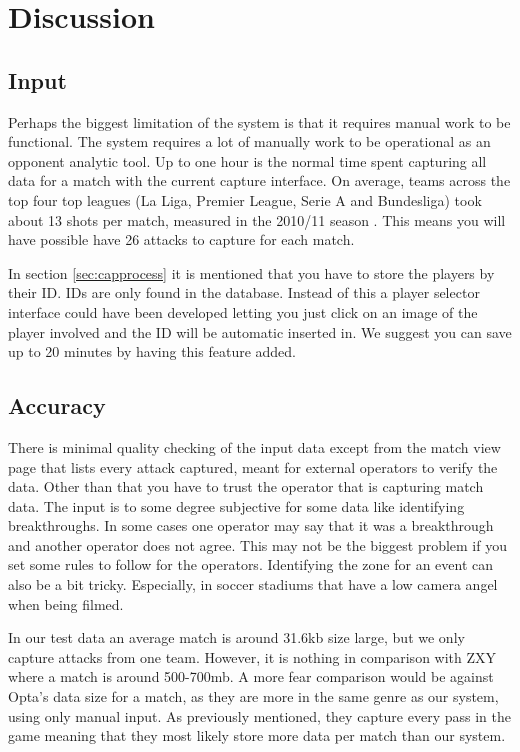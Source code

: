 \section{Discussion}
\subsection{Input}

Perhaps the biggest limitation of the system is that it requires manual work to be functional. The system requires a lot of manually work to be operational as an opponent analytic tool. Up to one hour is the normal time spent capturing all data for a match with the current capture interface. On average, teams across the top four top leagues (La Liga, Premier League, Serie A and Bundesliga) took about 13 shots per match, measured in the 2010/11 season \cite{soccerbynumbers}. This means you will have possible have 26 attacks to capture for each match. 

In section \ref{sec:capprocess} it is mentioned that you have to store the players by their ID. IDs are only found in the database. Instead of this a player selector interface could have been developed letting you just click on an image of the player involved and the ID will be automatic inserted in. We suggest you can save up to 20 minutes by having this feature added.

\subsection{Accuracy}

There is minimal quality checking of the input data except from the match view page that lists every attack captured, meant for external operators to verify the data. Other than that you have to trust the operator that is capturing match data. The input is to some degree subjective for some data like identifying breakthroughs. In some cases one operator may say that it was a breakthrough and another operator does not agree. This may not be the biggest problem if you set some rules to follow for the operators. Identifying the zone for an event can also be a bit tricky. Especially, in soccer stadiums that have a low camera angel when being filmed. 

In our test data an average match is around 31.6kb size large, but we only capture attacks from one team. However, it is nothing in comparison with ZXY where a match is around 500-700mb. A more fear comparison would be against Opta’s data size for a match, as they are more in the same genre as our system, using only manual input. As previously mentioned, they capture every pass in the game meaning that they most likely store more data per match than our system. 

